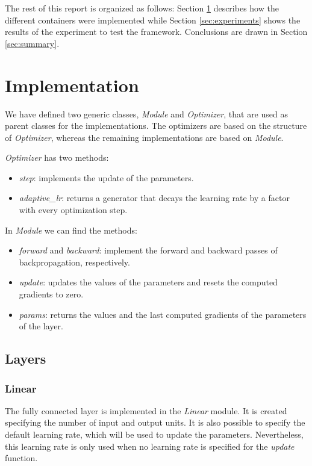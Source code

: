 \documentclass[10pt,conference,compsocconf]{IEEEtran}
\begin{document}
    The rest of this report is organized as follows: Section \ref{sec:implementation} describes how the different containers were implemented while Section \ref{sec:experiments} shows the results of the experiment to test the framework. Conclusions are drawn in Section \ref{sec:summary}. 
	
\section{Implementation} %
\label{sec:implementation}
    We have defined two generic classes, \textit{Module} and \textit{Optimizer}, that are used as parent classes for the implementations. The optimizers are based on the structure of \textit{Optimizer}, whereas the remaining implementations are based on \textit{Module}.
    
    \textit{Optimizer} has two methods: 
    \begin{itemize}
        \item \textit{step}: implements the update of the parameters.
        \item \textit{adaptive\_lr}: returns a generator that decays the learning rate by a factor with every optimization step.
    \end{itemize}
    
    In \textit{Module} we can find the methods:
    \begin{itemize}
        \item \textit{forward} and  \textit{backward}: implement the forward and backward passes of backpropagation, respectively.
        \item \textit{update}: updates the values of the parameters and resets the computed gradients to zero.
        \item \textit{params}: returns the values and the last computed gradients of the parameters of the layer.
    \end{itemize}

  \subsection{Layers} %
  \label{sub:modules}
    \subsubsection{Linear} %
    \label{ssub:linear}
        The fully connected layer is implemented in the \textit{Linear} module. It is created specifying the number of input and output units. It is also possible to specify the default learning rate, which will be used to update the parameters. Nevertheless, this learning rate is only used when no learning rate is specified for the \textit{update} function.
        
\end{document}
